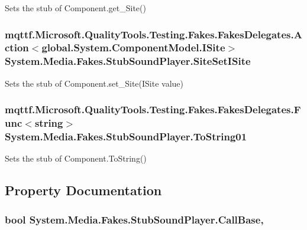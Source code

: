 Sets the stub of Component.\-get\-\_\-\-Site()

\hypertarget{class_system_1_1_media_1_1_fakes_1_1_stub_sound_player_aa23ba87f9cd29af144dddce337b3127d}{
\subsubsection[{Site\-Set\-I\-Site}]{\setlength{\rightskip}{0pt plus 5cm}mqttf.\-Microsoft.\-Quality\-Tools.\-Testing.\-Fakes.\-Fakes\-Delegates.\-Action$<$global.\-System.\-Component\-Model.\-I\-Site$>$ System.\-Media.\-Fakes.\-Stub\-Sound\-Player.\-Site\-Set\-I\-Site}}\label{class_system_1_1_media_1_1_fakes_1_1_stub_sound_player_aa23ba87f9cd29af144dddce337b3127d}


Sets the stub of Component.\-set\-\_\-\-Site(\-I\-Site value)

\hypertarget{class_system_1_1_media_1_1_fakes_1_1_stub_sound_player_a3686ecc06d366e84574847a8baf11ebe}{
\subsubsection[{To\-String01}]{\setlength{\rightskip}{0pt plus 5cm}mqttf.\-Microsoft.\-Quality\-Tools.\-Testing.\-Fakes.\-Fakes\-Delegates.\-Func$<$string$>$ System.\-Media.\-Fakes.\-Stub\-Sound\-Player.\-To\-String01}}\label{class_system_1_1_media_1_1_fakes_1_1_stub_sound_player_a3686ecc06d366e84574847a8baf11ebe}


Sets the stub of Component.\-To\-String()



\subsection{Property Documentation}
\hypertarget{class_system_1_1_media_1_1_fakes_1_1_stub_sound_player_a134a0b4c233f8d5a5eb82bdeabfcadb4}{
\subsubsection[{Call\-Base}]{\setlength{\rightskip}{0pt plus 5cm}bool System.\-Media.\-Fakes.\-Stub\-Sound\-Player.\-Call\-Base\hspace{0.3cm}{\ttfamily [get]}, {\ttfamily [set]}}}\label{class_system_1_1_media_1_1_fakes_1_1_stub_sound_player_a134a0b4c233f8d5a5eb82bdeabfcadb4}



